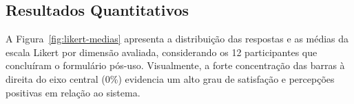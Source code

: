 \documentclass[article,a4paper,12pt,brazil,sumario=tradicional]{abntex2}
\begin{document}
\subsection{Resultados Quantitativos}

A Figura~\ref{fig:likert-medias} apresenta a distribuição das respostas e as médias da escala Likert por dimensão avaliada, considerando os 12 participantes que concluíram o formulário pós-uso. Visualmente, a forte concentração das barras à direita do eixo central (0\%) evidencia um alto grau de satisfação e percepções positivas em relação ao sistema.

\end{document}
